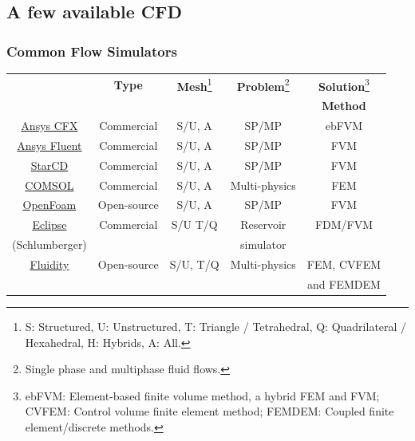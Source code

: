 \documentclass[10pt,compress,handout,ignorenonframetext]{beamer}
\begin{document}
\subsection{A few available CFD}  
\begin{frame}
 \frametitle{Common Flow Simulators}
\begin{center}
\begin{tabular}{||c|| c | c | c | c ||}
\hline\hline
                   & {\bf Type}  & 
{\bf Mesh}\footnote{S: Structured, U: Unstructured, T: Triangle / Tetrahedral, Q: Quadrilateral / Hexahedral, H: Hybrids, A: All.} & 
{\bf Problem}\footnote{Single phase and multiphase fluid flows.} & 
{\bf Solution}\footnote{ebFVM: Element-based finite volume method, a hybrid FEM and FVM; CVFEM: Control volume finite element method; FEMDEM: Coupled finite element/discrete methods.} \\
                   &             &            &               & {\bf Method}   \\
\hline\hline
\href{http://www.ansys.com/Products/Simulation+Technology/Fluid+Dynamics/Fluid+Dynamics+Products/ANSYS+CFX}
{Ansys CFX}          & Commercial  &  S/U, A    &   SP/MP  & ebFVM \\
\hline
\href{http://www.ansys.com/Products/Simulation+Technology/Fluid+Dynamics/Fluid+Dynamics+Products/ANSYS+Fluent}
{Ansys Fluent}       & Commercial  & S/U, A    &   SP/MP     & FVM           \\
\hline
\href{http://www.cd-adapco.com}
{StarCD}             & Commercial  & S/U, A    &   SP/MP     & FVM  \\ 
\hline
\href{http://www.uk.comsol.com/}
{COMSOL}            & Commercial   & S/U, A    &  Multi-physics & FEM \\
\hline
\href{http://www.openfoam.com/} 
{OpenFoam} & Open-source & S/U, A & SP/MP & FVM \\
\hline
\href{http://www.software.slb.com/products/foundation/pages/eclipse.aspx}
{Eclipse}  & Commercial & S/U T/Q    & Reservoir  &FDM/FVM \\
(Schlumberger)&         &            & simulator  &        \\
\hline
\href{http://www3.imperial.ac.uk/earthscienceandengineering/research/amcg/fluidity}
{Fluidity}             & Open-source & S/U, T/Q   & Multi-physics & FEM, CVFEM \\
                        &            &            &               & and FEMDEM \\

\hline\hline
\end{tabular}
 
\end{center}

\end{frame}
\end{document}
